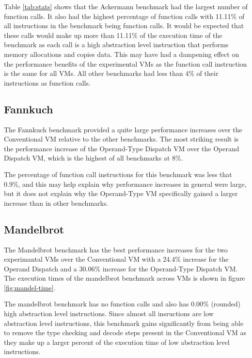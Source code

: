 \documentclass[english,a4paper,12pt]{report}
\begin{document}
Table \ref{tab:stats} shows that the Ackermann benchmark had the
largest number of function calls. It also had the highest percentage
of function calls with 11.11\% of all instructions in the benchmark
being function calls. It would be expected that these calls would make
up more than 11.11\% of the execution time of the benchmark as each
call is a high abstraction level instruction that performs memory
allocations and copies data. This may have had a dampening effect on
the performance benefits of the experimental VMs as the function call
instruction is the same for all VMs. All other benchmarks had less
than 4\% of their instructions as function calls.

\subsection{Fannkuch}
The Fannkuch benchmark provided a quite large performance increases
over the Conventional VM relative to the other benchmarks. The most
striking result is the performance increase of the Operand-Type
Dispatch VM over the Operand Dispatch VM, which is the highest of all
benchmarks at 8\%.

The percentage of function call instructions for this benchmark was
less that 0.9\%, and this may help explain why performance increases
in general were large, but it does not explain why the Operand-Type VM
specifically gained a larger increase than in other benchmarks.

\subsection{Mandelbrot}
The Mandelbrot benchmark has the best performance increases for the
two experimantal VMs over the Conventional VM with a 24.4\% increase
for the Operand Dispatch and a 30.06\% increase for the Operand-Type
Dispatch VM. The execution times of the mandelbrot benchmark across
VMs is shown in figure \ref{fig:mandel-time}.

The mandelbrot benchmark has no function calls and also has
0.00\% (rounded) high abstraction level instructions. Since almost all
insructions are low abstraction level instructions, this benchmark
gains significantly from being able to remove the type checking and
decode steps present in the Conventional VM as they make up a larger
percent of the execution time of low abstraction level instructions.
\end{document}
